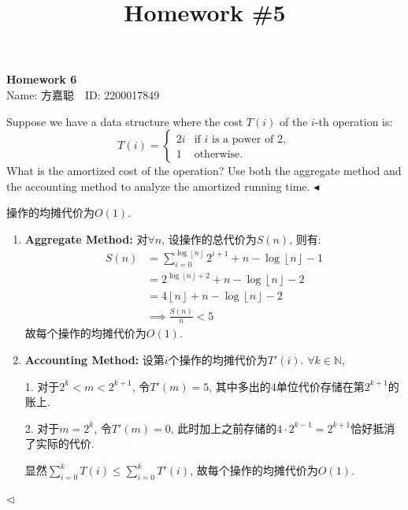 \documentclass[11pt]{article}
\title{Homework \#5}
\newenvironment{problem}[2][Problem]{\begin{trivlist}
\item[\hskip \labelsep{\bfseries#1}\hskip\labelsep{\bfseries#2.}]}{\hfill$\blacktriangleleft$\end{trivlist}}
\newenvironment{answer}[1][Answer]{\begin{trivlist}
\item[\hskip \labelsep{\bfseries\itshape#1.}\hskip \labelsep]}{\hfill$\lhd$\end{trivlist}}
\begin{document}
\kaishu

\pagestyle{fancy}
\chead{}

\begin{center}
    {\LARGE \bf Homework 6}\\
    {Name: 方嘉聪\ \  ID: 2200017849}            %
\end{center}

\begin{problem}{1. (Aggregate Analysis and Accounting Method)}
    Suppose we have a data structure where the cost $T(i)$ of the $i$-th operation is:
\begin{equation*}
    T(i)=
    \begin{cases}
    2i &\text{if }i \text{ is a power of }2, \\
    1 &\text{otherwise}.
    \end{cases}
\end{equation*}
What is the amortized cost of the operation? Use both the aggregate method and the accounting method to analyze the amortized running time.
\end{problem}
\begin{answer}
    操作的均摊代价为$O(1)$.
    \begin{enumerate}[label = (\alph*)]
        \item \textbf{Aggregate Method: } 对$\forall n$, 设操作的总代价为$S(n)$, 则有:
        \begin{align*}
            S(n) &= \sum_{i=0}^{\log \left\lfloor n \right\rfloor} 2^{i+1} + n - \log \left\lfloor n \right\rfloor - 1 \\
            &= 2^{\log \left\lfloor n \right\rfloor + 2} + n - \log \left\lfloor n \right\rfloor - 2 \\
            &= 4\left\lfloor n \right\rfloor  + n - \log \left\lfloor n \right\rfloor - 2 \\
            &\implies \frac{S(n)}{n} < 5
        \end{align*}
        故每个操作的均摊代价为$O(1)$.
        \item \textbf{Accounting Method: }设第$i$个操作的均摊代价为$T'(i)$. $\forall k \in \mathbb{N}$, 
        
        1. 对于$2^k < m < 2^{k+1}$, 令$T'(m) = 5$, 其中多出的$4$单位代价存储在第$2^{k+1}$的账上.

        2. 对于$m = 2^k$, 令$T'(m) = 0$, 此时加上之前存储的$4 \cdot 2^{k-1} = 2^{k+1}$恰好抵消了实际的代价.

        显然$\sum_{i=0}^{k} T(i) \le \sum_{i=0}^{k} T'(i)$, 故每个操作的均摊代价为$O(1)$.
    \end{enumerate}
\end{answer}
\end{document}
